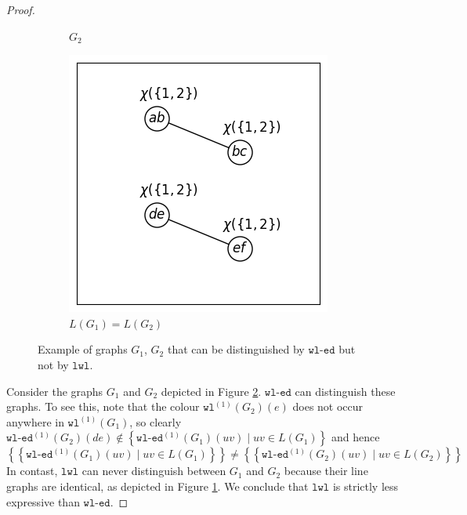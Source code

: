 \documentclass{article}
\newcommand{\set}[1]{\left\{#1\right\}}
\newcommand{\multiset}[1]{\left\{\!\!\left\{#1\right\}\!\!\right\}}
\newcommand{\iter}[1]{^{(#1)}}
\newcommand{\wl}{\texttt{wl}}
\newcommand{\wledge}{\texttt{wl-ed}}
\newcommand{\lwl}{\texttt{lwl}}
\begin{document}
\begin{proof}
\begin{figure}[ht]
\begin{subfigure}[b]{0.25\textwidth}
            \caption{$G_2$}
        \end{subfigure}
        \begin{subfigure}[b]{0.25\textwidth}
            \includegraphics[width=\textwidth]{figures/lwl vs wl-ed/L(G1)-L(G2).png}
            \caption{$L(G_1)=L(G_2)$}   \label{subfig:line-graphs}
        \end{subfigure}
        \caption{Example of graphs $G_1$, $G_2$ that can be distinguished by $\wledge$ but not by $\lwl$.}
        \label{fig:lwl-wledge-counterexample}
    \end{figure}

    Consider the graphs $G_1$ and $G_2$ depicted in Figure \ref{fig:lwl-wledge-counterexample}.
    $\wledge$ can distinguish these graphs. To see this, note that the colour $\wl\iter{1}(G_2)(e)$ does not occur anywhere in $\wl\iter{1}(G_1)$, so clearly $\wledge\iter{1}(G_2)(de) \notin \set{\wledge\iter{1}(G_1)(uv) \mid uv\in L(G_1)}$
    and hence
    \begin{equation}
        \multiset{\wledge\iter{1}(G_1)(uv) \mid uv\in L(G_1)} \neq \multiset{\wledge\iter{1}(G_2)(uv) \mid uv\in L(G_2)}
    \end{equation}
    In contast, $\lwl$ can never distinguish between $G_1$ and $G_2$ because their line graphs are identical, as depicted in Figure \ref{subfig:line-graphs}. We conclude that $\lwl$ is strictly less expressive than $\wledge$.
\end{proof}
\end{document}
